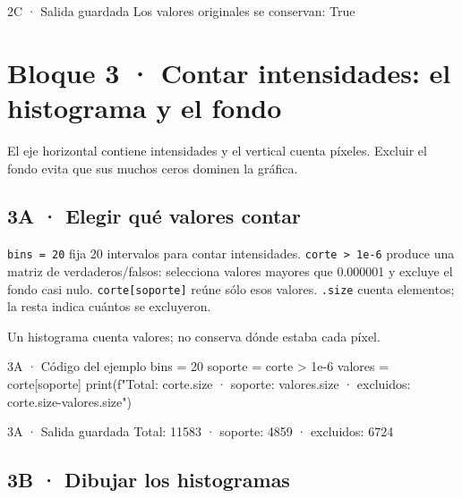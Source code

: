 
\begin{Salida}{2C · Salida guardada}
Los valores originales se conservan: True
\end{Salida}


\clearpage

\section*{Bloque 3 · Contar intensidades: el histograma y el fondo}


\label{vivo:bloque3}

El eje horizontal contiene intensidades y el vertical cuenta píxeles. Excluir el fondo evita que sus muchos ceros dominen la gráfica.


\subsection*{3A · Elegir qué valores contar}

\label{vivo:3a}

\texttt{\small bins = 20} fija 20 intervalos para contar intensidades. \texttt{\small corte > 1e-6} produce una matriz de verdaderos/falsos: selecciona valores mayores que 0.000001 y excluye el fondo casi nulo. \texttt{\small corte[soporte]} reúne sólo esos valores. \texttt{\small .\allowbreak{}size} cuenta elementos; la resta indica cuántos se excluyeron.

Un histograma cuenta valores; no conserva dónde estaba cada píxel.

\begin{CodigoVivo}{3A · Código del ejemplo}
bins = 20
soporte = corte > 1e-6
valores = corte[soporte]
print(f"Total: {corte.size} · soporte: {valores.size} · excluidos: {corte.size-valores.size}")
\end{CodigoVivo}


\begin{Salida}{3A · Salida guardada}
Total: 11583 · soporte: 4859 · excluidos: 6724
\end{Salida}



\subsection*{3B · Dibujar los histogramas}

